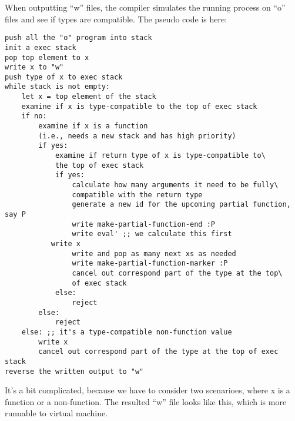 \documentclass{article}
\begin{document}
When outputting ``w'' files, the compiler simulates the running process on ``o'' files and see if types are compatible. The pseudo code is here:

\begin{Verbatim}
push all the "o" program into stack
init a exec stack
pop top element to x
write x to "w"
push type of x to exec stack
while stack is not empty:
    let x = top element of the stack
    examine if x is type-compatible to the top of exec stack
    if no:
        examine if x is a function
        (i.e., needs a new stack and has high priority)
        if yes:
            examine if return type of x is type-compatible to\
            the top of exec stack
            if yes:
                calculate how many arguments it need to be fully\
                compatible with the return type
                generate a new id for the upcoming partial function, say P
                write make-partial-function-end :P
                write eval' ;; we calculate this first
     	   write x
                write and pop as many next xs as needed
                write make-partial-function-marker :P
                cancel out correspond part of the type at the top\
                of exec stack
            else:
                reject
        else:
            reject
    else: ;; it's a type-compatible non-function value
        write x
        cancel out correspond part of the type at the top of exec stack
reverse the written output to "w"
\end{Verbatim}

It's a bit complicated, because we have to consider two scenarioes, where x is a function or a non-function. The resulted ``w'' file looks like this, which is more runnable to virtual machine.
\end{document}
